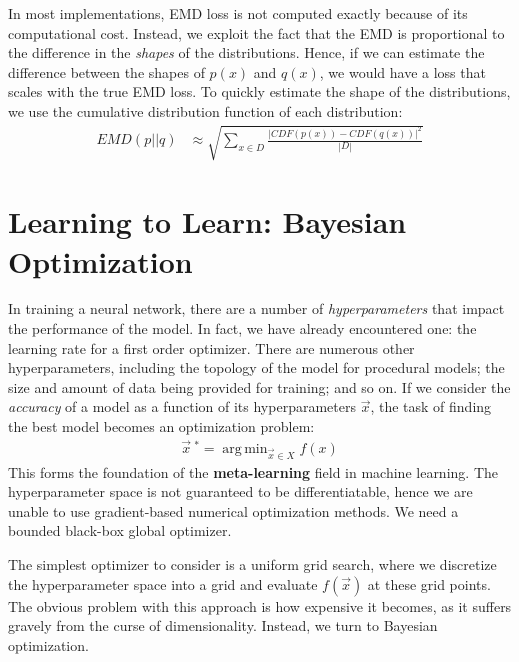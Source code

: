 \documentclass[paper=a4, fontsize=12pt]{scrartcl} %
\numberwithin{equation}{section} %
\numberwithin{figure}{section} %
\numberwithin{table}{section} %
\DeclareMathOperator*{\argmin}{arg\,min}
\begin{document}
In most implementations, EMD loss is not computed exactly because of its computational cost. Instead, we exploit the fact that the EMD is proportional to the difference in the \textit{shapes}
of the distributions. Hence, if we can estimate the difference between the shapes of $p(x)$ and $q(x)$, we would have a loss that scales with the true EMD loss. To quickly estimate the shape of the distributions, 
we use the cumulative distribution function of each distribution:
\begin{align*}
    EMD(p||q) &\approx \sqrt{\sum_{x \in D} \frac{|CDF(p(x)) - CDF(q(x))|^2}{|D|}}
\end{align*}

\pagebreak


\section{Learning to Learn: Bayesian Optimization} %

In training a neural network, there are a number of \textit{hyperparameters} that impact the performance of the model. In fact, we have already encountered one: the learning rate for a first order optimizer. There are numerous
other hyperparameters, including the topology of the model for procedural models; the size and amount of data being provided for training; and so on. If we consider the \textit{accuracy} of a model as a function 
of its hyperparameters $\vec{x}$, the task of finding the best model becomes an optimization problem:
\begin{align*}
    \vec{x} \ ^* = \argmin_{\vec{x} \in X} f(x)
\end{align*}
This forms the foundation of the \textbf{meta-learning} field in machine learning. The hyperparameter space is not guaranteed to be differentiatable, hence we are unable to use 
gradient-based numerical optimization methods. We need a bounded black-box global optimizer.

The simplest optimizer to consider is a uniform grid search, where we discretize the hyperparameter space into a grid and evaluate $f(\vec{x})$ at these grid points. The obvious problem with this 
approach is how expensive it becomes, as it suffers gravely from the curse of dimensionality. Instead, we turn to Bayesian optimization.
\end{document}
